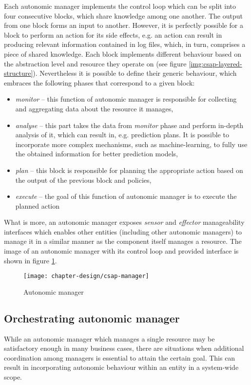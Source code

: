 Each autonomic manager implements the control loop which can be split into four consecutive blocks, which share knowledge among one another. The output from one block forms an input to another. However, it is perfectly possible for a block to perform an action for its side effects, e.g. an action can result in producing relevant information contained in log files, which, in turn, comprises a piece of shared knowledge. Each block implements different behaviour based on the abstraction level and resource they operate on (see figure \ref{img:csap-layered-structure}). Nevertheless it is possible to define their generic behaviour, which embraces the following phases that correspond to a given block:
\begin{itemize}
  \item \emph{monitor} -- this function of autonomic manager is responsible for collecting and aggregating data about the resource it manages,
  \item \emph{analyse} -- this part takes the data from \emph{monitor} phase and perform in-depth analysis of it, which can result in, e.g. prediction plans. It is possible to incorporate more complex mechanisms, such as machine-learning, to fully use the obtained information for better prediction models,
  \item \emph{plan} -- this block is responsible for planning the appropriate action based on the output of the previous block and policies,
  \item \emph{execute} -- the goal of this function of autonomic manager is to execute the planned action
\end{itemize}
What is more, an autonomic manager exposes \emph{sensor} and \emph{effector} manageability interfaces which enables other entities (including other autonomic managers) to manage it in a similar manner as the component itself manages a resource. The image of an autonomic manager with its control loop and provided interface is shown in figure \ref{img:csap-manager}.

\begin{figure}[!ht]
  \begin{center}
    \texttt{[image: chapter-design/csap-manager]}
  \end{center}
  \caption{Autonomic manager}
  \label{img:csap-manager}
\end{figure}

\subsection{Orchestrating autonomic manager}
While an autonomic manager which manages a single resource may be satisfactory enough in many business cases, there are situations when additional coordination among managers is essential to attain the certain goal. This can result in incorporating autonomic behaviour within an entity in a system-wide scope.

